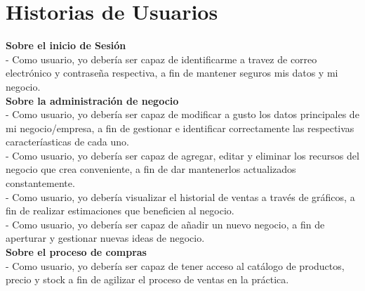 \chapter{Historias de Usuarios}
\setlength{\parindent}{0pt}
\textbf{Sobre el inicio de Sesión}\\
- Como usuario, yo debería ser capaz de identificarme a travez de correo electrónico y contraseña respectiva, a fin de mantener seguros mis datos y mi negocio.\\
\textbf{Sobre la administración de negocio}\\
- Como usuario, yo debería ser capaz de modificar a gusto los datos principales de mi negocio/empresa, a fin de gestionar e identificar correctamente las respectivas caracteríasticas de cada uno.\\
- Como usuario, yo debería ser capaz de agregar, editar y eliminar los recursos del negocio que crea conveniente, a fin de dar mantenerlos actualizados constantemente.\\
- Como usuario, yo debería visualizar el historial de ventas a través de gráficos, a fin de realizar estimaciones que beneficien al negocio.\\
- Como usuario, yo debería ser capaz de añadir un nuevo negocio, a fin de aperturar y gestionar nuevas ideas de negocio.\\
\textbf{Sobre el proceso de compras}\\
- Como usuario, yo debería ser capaz de tener acceso al catálogo de productos, precio y stock a fin de agilizar el proceso de ventas en la práctica. 